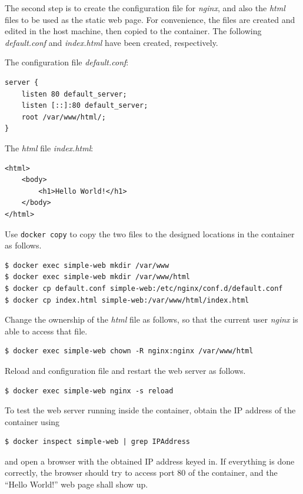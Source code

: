 The second step is to create the configuration file for \textit{nginx}, and also the \textit{html} files to be used as the static web page. For convenience, the files are created and edited in the host machine, then copied to the container. The following \textit{default.conf} and \textit{index.html} have been created, respectively.

The configuration file \textit{default.conf}:
\begin{lstlisting}
server {
	listen 80 default_server;
	listen [::]:80 default_server;
	root /var/www/html/;
}
\end{lstlisting}

The \textit{html} file \textit{index.html}:
\begin{lstlisting}
<html>
	<body>
		<h1>Hello World!</h1>
	</body>
</html>
\end{lstlisting}

Use \verb|docker copy| to copy the two files to the designed locations in the container as follows.
\begin{lstlisting}
$ docker exec simple-web mkdir /var/www
$ docker exec simple-web mkdir /var/www/html
$ docker cp default.conf simple-web:/etc/nginx/conf.d/default.conf
$ docker cp index.html simple-web:/var/www/html/index.html
\end{lstlisting}

Change the ownership of the \textit{html} file as follows, so that the current user \textit{nginx} is able to access that file.
\begin{lstlisting}
$ docker exec simple-web chown -R nginx:nginx /var/www/html
\end{lstlisting}

Reload and configuration file and restart the web server as follows.
\begin{lstlisting}
$ docker exec simple-web nginx -s reload
\end{lstlisting}

To test the web server running inside the container, obtain the IP address of the container using
\begin{lstlisting}
$ docker inspect simple-web | grep IPAddress
\end{lstlisting}
and open a browser with the obtained IP address keyed in. If everything is done correctly, the browser should try to access port 80 of the container, and the ``Hello World!'' web page shall show up.

